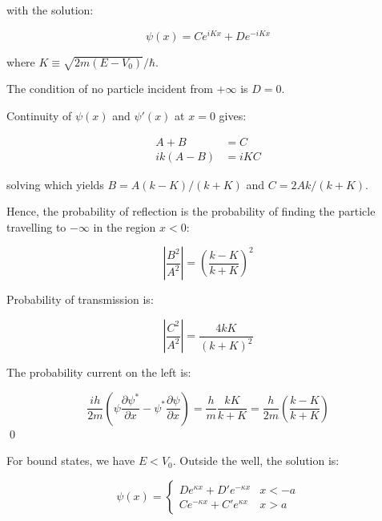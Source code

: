 \documentclass[12pt]{article}
\begin{document}
with the solution:

\begin{equation}
    \psi(x) = Ce^{iKx} + De^{-iKx}
\end{equation}

where $K \equiv \sqrt{2m(E - V_{0})}/\hbar$.

The condition of no particle incident from $+\infty$ is $D = 0$.

Continuity of $\psi(x)$ and $\psi'(x)$ at $x = 0$ gives:

\begin{equation}
    \begin{split}
        A + B &= C \\
        ik(A - B) &= iKC
    \end{split}
\end{equation}

solving which yields $B = A(k - K)/(k + K)$ and $C = 2Ak/(k + K)$.

Hence, the probability of reflection is the probability of finding the particle travelling to $-\infty$ in the region $x < 0$:

\begin{equation}
    \left\lvert \frac{B^{2}}{A^{2}} \right\rvert = \left( \frac{k - K}{k + K} \right)^{2}
\end{equation}

Probability of transmission is:

\begin{equation}
    \left\lvert \frac{C^{2}}{A^{2}} \right\rvert = \frac{4kK}{(k + K)^{2}}
\end{equation}

The probability current on the left is:

\begin{equation}
    \frac{ih}{2m} \left( \psi \frac{\partial \psi^{*}}{\partial x} - \psi^{*} \frac{\partial \psi}{\partial x} \right) = \frac{h}{m} \frac{kK}{k + K} = \frac{h}{2m} \left( \frac{k - K}{k + K} \right)
\end{equation}
\qed


For bound states, we have $E < V_{0}$. Outside the well, the solution is:

\begin{equation}
    \psi(x) =
    \begin{cases}
        De^{\kappa x} + D'e^{-\kappa x} & x < -a \\
        Ce^{-\kappa x} + C'e^{\kappa x} & x > a
    \end{cases}
\end{equation}
\end{document}
